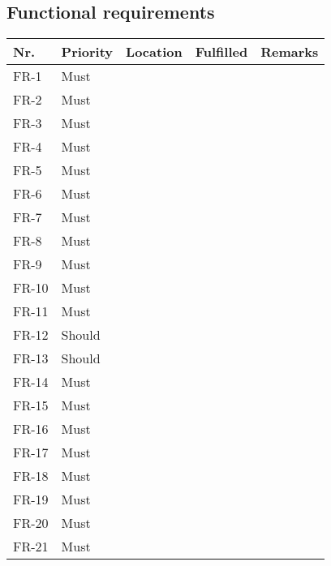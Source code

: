 \subsection{Functional requirements}
\begin{table}[H]
    \begin{tabular}{lllll}
    
        Nr.   & Priority & Location & Fulfilled & Remarks \\ \hline
        FR-1  & Must     & ~        & ~         & ~       \\ 
        FR-2  & Must     & ~        & ~         & ~       \\ 
        FR-3  & Must     & ~        & ~         & ~       \\ 
        FR-4  & Must     & ~        & ~         & ~       \\ 
        FR-5  & Must     & ~        & ~         & ~       \\ 
        FR-6  & Must     & ~        & ~         & ~       \\ 
        FR-7  & Must     & ~        & ~         & ~       \\ 
        FR-8  & Must     & ~        & ~         & ~       \\ 
        FR-9  & Must     & ~        & ~         & ~       \\ 
        FR-10 & Must     & ~        & ~         & ~       \\ 
        FR-11 & Must     & ~        & ~         & ~       \\ 
        FR-12 & Should   & ~        & ~         & ~       \\ 
        FR-13 & Should   & ~        & ~         & ~       \\ 
        FR-14 & Must     & ~        & ~         & ~       \\ 
        FR-15 & Must     & ~        & ~         & ~       \\ 
        FR-16 & Must     & ~        & ~         & ~       \\ 
        FR-17 & Must     & ~        & ~         & ~       \\ 
        FR-18 & Must     & ~        & ~         & ~       \\ 
        FR-19 & Must     & ~        & ~         & ~       \\ 
        FR-20 & Must     & ~        & ~         & ~       \\ 
        FR-21 & Must     & ~        & ~         & ~       \\ 

\end{tabular}
\end{table}
